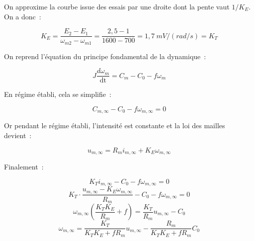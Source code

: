 \begin{texteCache}

On approxime la courbe issue des essais par une droite dont la pente
  vaut \(1/K_{E}\). On a donc~:


\[K_{E} = \frac{E_{2} - E_{1}}{\omega_{m2} - \omega_{m1}} = \frac{2,5 - 1}{1600 - 700} = 1,7\ mV/(rad/s)=K_T\]

\end{texteCache}


\begin{texteCache}

On reprend l'équation du principe fondamental de la dynamique~:


\[J\frac{d\omega_{m}}{\text{dt}} = C_{m} - C_{0} - f\omega_{m}\]

En régime établi, cela se simplifie~:

\[C_{m,\infty} - C_{0} - f\omega_{m,\infty} = 0\]

Or pendant le régime établi, l'intensité est constante et la loi des
mailles devient~:

\[u_{m,\infty} = R_{m}i_{m,\infty} + K_{E}\omega_{m,\infty}\]

Finalement~:

\[{K_{T}i_{m,\infty} - C_{0} - f\omega_{m,\infty} = 0}\]\[{K_{T} \cdot \frac{u_{m,\infty} - K_{E}\omega_{m,\infty}}{R_{m}} - C_{0} - f\omega_{m,\infty} = 0}\]\[{\omega_{m,\infty}\left( \frac{K_{T}K_{E}}{R_{m}} + f \right) = \frac{K_{T}}{R_{m}}u_{m,\infty} - C_{0}}\]\[{\omega_{m,\infty} = \frac{K_{T}}{K_{T}K_{E} + fR_{m}}u_{m,\infty} - \frac{R_{m}}{K_{T}K_{E} + fR_{m}}C_{0}}\]

\end{texteCache}


